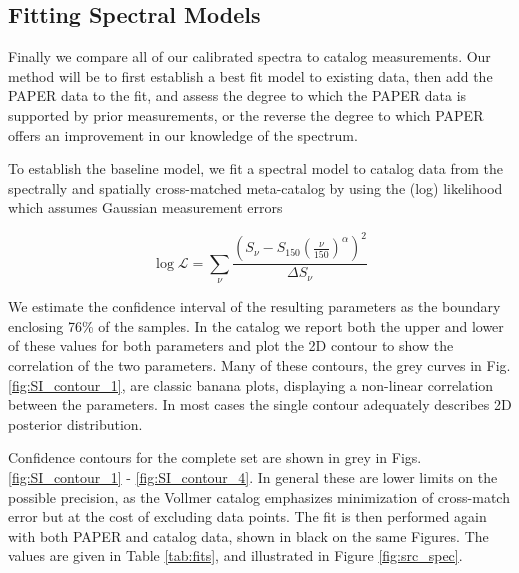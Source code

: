 \documentclass[preprint]{aastex}
\newcommand{\logL}{\log\mathcal{L}}
\begin{document}


\subsection{Fitting Spectral Models}
\label{sec:fitting_models}

Finally we compare all of our  calibrated spectra to catalog measurements. Our method
will be to first establish a best fit model to existing data, then add the PAPER data
to the fit, and assess the degree to which the PAPER data is supported by prior measurements, or the reverse
the degree to which PAPER offers an improvement in our knowledge of the spectrum.

 To establish the baseline model, we
fit a spectral model to catalog data from the spectrally and spatially
cross-matched meta-catalog by \citet{Vollmer:2010p6422} using the
 (log) likelihood which assumes Gaussian measurement errors

\begin{equation}
\logL = \sum_\nu{\frac{\left(S_\nu - S_{150}\left(\frac{\nu}{150}\right)^\alpha\right)^2}{\Delta S_\nu} }
\end{equation}


We estimate the confidence interval of the resulting parameters as the boundary
enclosing 76\% of the samples. In the catalog we report both the upper and
lower of these values for both parameters and plot the 2D contour to show the
correlation of the two parameters. Many of these contours, the grey curves in
Fig. \ref{fig:SI_contour_1}, are classic banana plots, displaying a non-linear
correlation between the parameters.    In most cases the single contour
adequately describes 2D posterior distribution.

Confidence contours for
the complete set are shown in grey in Figs. \ref{fig:SI_contour_1} -
\ref{fig:SI_contour_4}.  In general these are lower limits on the possible
precision, as the Vollmer catalog emphasizes minimization of cross-match error
but at the cost of excluding data points.  The fit is then performed again with
both PAPER and catalog data, shown in black on the same Figures. The values are
given in Table \ref{tab:fits}, and
illustrated in Figure \ref{fig:src_spec}.  
\end{document}

